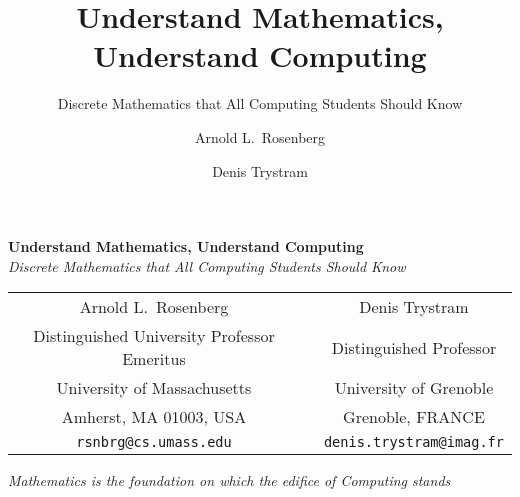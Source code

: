 \documentclass[envcountchap]{svmono}
\begin{document}


\author{Arnold L.~Rosenberg \and Denis Trystram}
\title{Understand Mathematics, Understand Computing}
\subtitle{Discrete Mathematics that All Computing Students Should Know}

\maketitle

\begin{center}
{\Large\bf Understand Mathematics, Understand Computing} \\
{\large\it Discrete Mathematics that All Computing Students Should Know}
\end{center}


\begin{center}
\begin{tabular}{ccc}
{\large Arnold L.~Rosenberg} & & {\large Denis Trystram} \\
Distinguished University Professor Emeritus
  & & Distinguished Professor \\
University of Massachusetts  & & University of Grenoble \\
Amherst, MA 01003, USA       & & Grenoble, FRANCE \\
{\small\tt rsnbrg@cs.umass.edu} & & {\small\tt denis.trystram@imag.fr}
\end{tabular}
\end{center}

\vspace*{.25in}

{\it Mathematics is the foundation on which the edifice of Computing
  stands}

\begin{figure}[h]
\centerline{}
\end{figure}





\frontmatter

%

%

\tableofcontents

\end{document}
